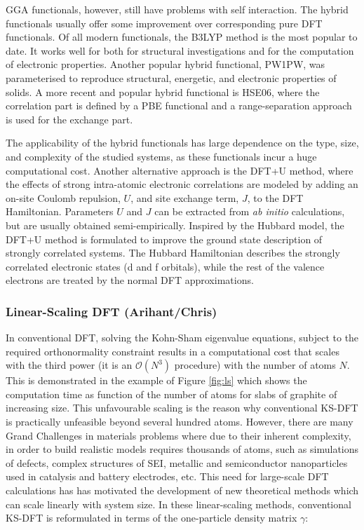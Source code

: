 \documentclass[../main.tex]{subfiles}
\begin{document}
GGA functionals, however, still have problems with self interaction. The hybrid functionals usually offer some improvement over corresponding pure DFT functionals. Of all modern functionals, the B3LYP method is the most popular to date. \cite{adb1993b,cl1988785} It works well for both for structural investigations and for the computation of electronic properties. \cite{Cramer} Another popular hybrid functional, PW1PW, \cite{Bredow00,IslamPRB} was parameterised to reproduce structural, energetic, and electronic properties of solids. A more recent and popular hybrid functional is HSE06, where  the correlation part is defined by a PBE functional and a range-separation approach is used for the exchange part. \cite{HSE06}  

The applicability of the hybrid functionals has large dependence on the type, size, and complexity of the studied systems, as these functionals incur a huge computational cost. Another alternative approach is the DFT+U method, where the effects of strong intra-atomic electronic correlations are modeled by adding an on-site Coulomb repulsion, $U$, and site exchange term, $J$, to the DFT Hamiltonian. \cite{DFT-U-1,DFT-U-2,DFT-U-3} Parameters $U$ and $J$ can be extracted from \textit{ab initio} calculations, but are usually obtained semi-empirically. Inspired by the Hubbard model, the DFT+U method is formulated to improve the ground state description of strongly correlated systems. The Hubbard Hamiltonian describes the strongly correlated electronic states (d and f orbitals), while the rest of the valence electrons are treated by the normal DFT approximations. 

\subsubsection{Linear-Scaling DFT (Arihant/Chris)}
\label{sec:lsdft}
In conventional DFT, solving the Kohn-Sham eigenvalue equations, subject to the required orthonormality constraint results in a computational cost that scales with the third power (it is an  $\mathcal{O}(N^3)$ procedure) with the number of atoms $N$. This is demonstrated in the example of Figure \ref{fig:ls} which shows the computation time as function of the number of atoms for slabs of graphite of increasing size. This unfavourable scaling is the reason why conventional KS-DFT is  practically unfeasible beyond several hundred atoms. However, there are many Grand Challenges in materials problems where due to their inherent complexity, in order to build realistic models requires thousands of atoms, such as simulations of defects, complex structures of SEI, metallic and semiconductor nanoparticles used in catalysis and battery electrodes, etc. This need for large-scale DFT calculations has has motivated the development of new theoretical methods which can scale linearly with system size.\cite{Goedecker1999} In these linear-scaling methods, conventional KS-DFT is reformulated in terms of the one-particle density matrix $\gamma$:
\end{document}
